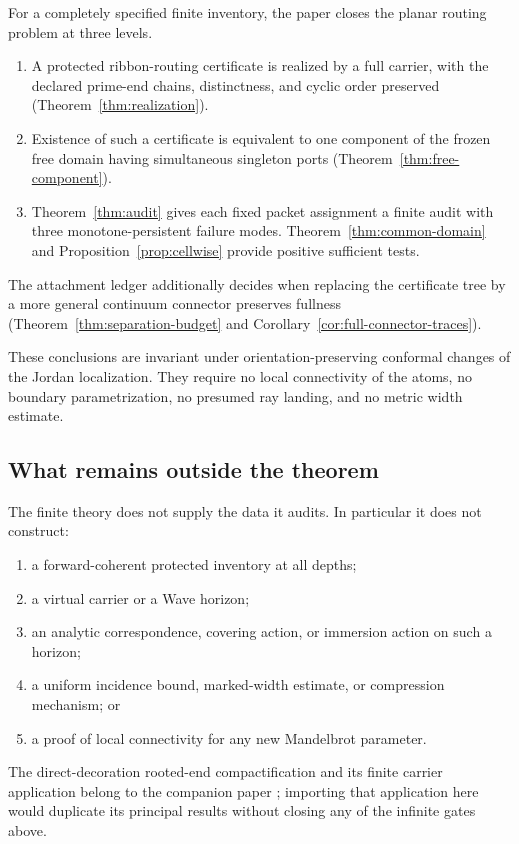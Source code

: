 \documentclass[11pt,reqno]{amsart}
\theoremstyle{definition}
\theoremstyle{remark}
\begin{document}
For a completely specified finite inventory, the paper closes the planar
routing problem at three levels.
\begin{enumerate}
\item A protected ribbon-routing certificate is realized by a full carrier,
with the declared prime-end chains, distinctness, and cyclic order preserved
(Theorem~\ref{thm:realization}).
\item Existence of such a certificate is equivalent to one component of the
frozen free domain having simultaneous singleton ports
(Theorem~\ref{thm:free-component}).
\item Theorem~\ref{thm:audit} gives each fixed packet assignment a finite
audit with three monotone-persistent failure modes.
Theorem~\ref{thm:common-domain} and Proposition~\ref{prop:cellwise}
provide positive sufficient tests.
\end{enumerate}
The attachment ledger additionally decides when replacing the certificate
tree by a more general continuum connector preserves fullness
(Theorem~\ref{thm:separation-budget} and
Corollary~\ref{cor:full-connector-traces}).

These conclusions are invariant under orientation-preserving conformal
changes of the Jordan localization.  They require no local connectivity of
the atoms, no boundary parametrization, no presumed ray landing, and no
metric width estimate.

\subsection{What remains outside the theorem}

The finite theory does not supply the data it audits.  In particular it does
not construct:
\begin{enumerate}
\item a forward-coherent protected inventory at all depths;
\item a virtual carrier or a Wave horizon;
\item an analytic correspondence, covering action, or immersion action on
such a horizon;
\item a uniform incidence bound, marked-width estimate, or compression
mechanism; or
\item a proof of local connectivity for any new Mandelbrot parameter.
\end{enumerate}
The direct-decoration rooted-end compactification and its finite carrier
application belong to the companion paper \cite{Wes26}; importing that
application here would duplicate its principal results without closing any
of the infinite gates above.
\end{document}

